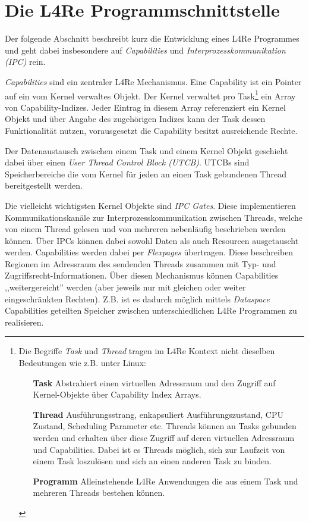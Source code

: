\section{Die L4Re Programmschnittstelle}
\label{sec:l4re_pi}

Der folgende Abschnitt beschreibt kurz die Entwicklung eines L4Re Programmes
und geht dabei insbesondere auf \textit{Capabilities} und
\textit{Interprozesskommunikation (IPC)} rein.

\textit{Capabilities} sind ein zentraler L4Re Mechanismus. Eine Capability ist
ein Pointer auf ein vom Kernel verwaltes Objekt. Der Kernel verwaltet pro
Task\footnote{Die Begriffe \textit{Task} und \textit{Thread} tragen im L4Re
Kontext nicht dieselben Bedeutungen wie z.B. unter Linux:
\begin{itemize}
  \item[\textbf{Task}]
    Abstrahiert einen virtuellen Adressraum und den Zugriff auf Kernel-Objekte
    über Capability Index Arrays.
  \item[\textbf{Thread}]
    Ausführungsstrang, enkapsuliert Ausführungszustand, CPU Zustand,
    Scheduling Parameter etc. Threads können an Tasks gebunden werden und
    erhalten über diese Zugriff auf deren virtuellen Adressraum und Capabilities.
    Dabei ist es Threads möglich, sich zur Laufzeit von einem Task loszulösen
    und sich an einen anderen Task zu binden.
  \item[\textbf{Programm}]
    Alleinstehende L4Re Anwendungen die aus einem Task und mehreren Threads
    bestehen können.
\end{itemize}}
ein Array von Capability-Indizes. Jeder Eintrag in diesem Array referenziert
ein Kernel Objekt und über Angabe des zugehörigen Indizes kann der Task dessen
Funktionalität nutzen, vorausgesetzt die Capability besitzt ausreichende
Rechte.

Der Datenaustausch zwischen einem Task und einem Kernel Objekt
geschieht dabei über einen \textit{User Thread Control Block (UTCB)}. UTCBs
sind Speicherbereiche die vom Kernel für jeden an einen Task gebundenen
Thread bereitgestellt werden.

Die vielleicht wichtigsten Kernel Objekte sind \textit{IPC Gates}. Diese
implementieren Kommunikationskanäle zur Interprozesskommunikation zwischen
Threads, welche von einem Thread gelesen und von mehreren nebenläufig
beschrieben werden können. Über IPCs können dabei sowohl Daten als auch
Resourcen ausgetauscht werden. Capabilities werden dabei per \textit{Flexpages}
übertragen. Diese beschreiben Regionen im Adressraum des sendenden Threads
zusammen mit Typ- und Zugriffsrecht-Informationen. Über diesen Mechanismus
können Capabilities ,,weitergereicht'' werden (aber jeweils nur mit gleichen
oder weiter eingeschränkten Rechten). Z.B. ist es dadurch möglich mittels
\textit{Dataspace} Capabilities geteilten Speicher zwischen unterschiedlichen
L4Re Programmen zu realisieren.

